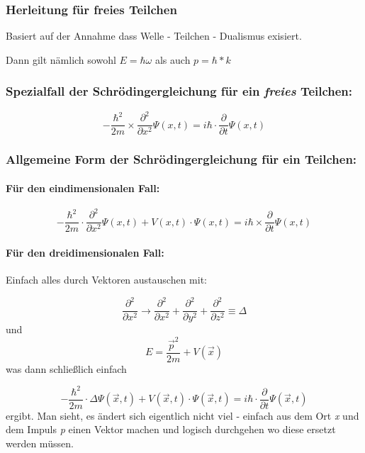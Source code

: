 \subsubsection{Herleitung für freies Teilchen}
Basiert auf der Annahme dass Welle - Teilchen - Dualismus exisiert. 

Dann gilt nämlich sowohl $E = \hbar \omega$ als auch $p = \hbar * k$

\subsubsection{Spezialfall der Schrödingergleichung für ein \textit{freies} Teilchen:}
\begin{equation}
    -\frac{\hbar^2}{2m} \times \frac{\partial^2}{\partial x^2} \Psi(x,t)  = i \hbar \cdot \frac{\partial}{\partial t} \Psi(x,t)
\end{equation}

\subsubsection{Allgemeine Form der Schrödingergleichung für ein Teilchen:}

\paragraph{Für den eindimensionalen Fall:}
\begin{equation}
    -\frac{\hbar^2}{2m} \cdot \frac{\partial^2}{\partial x^2} \Psi(x,t) + V(x,t) \cdot \Psi(x,t) = i \hbar \times \frac{\partial}{\partial t} \Psi(x,t)
\end{equation}

\paragraph{Für den dreidimensionalen Fall:}

Einfach alles durch Vektoren austauschen mit: 

\begin{equation}
    \frac{\partial^2}{\partial x^2} \longrightarrow \frac{\partial^2}{\partial x^2} + \frac{\partial^2}{\partial y^2} + \frac{\partial^2}{\partial z^2} \equiv \Delta
\end{equation}
und 
\begin{equation}
    E = \frac{\vec{p}^2}{2m} + V(\vec{x})
\end{equation}
was dann schließlich einfach

\begin{equation}
    -\frac{\hbar^2}{2m} \cdot \Delta \Psi(\vec{x},t) + V(\vec{x},t) \cdot \Psi(\vec{x},t) = i \hbar \cdot \frac{\partial}{\partial t} \Psi(\vec{x},t)
\end{equation}
ergibt. Man sieht, es ändert sich eigentlich nicht viel - einfach aus dem Ort \textit{x} und dem Impuls \textit{p} einen Vektor machen und logisch durchgehen wo diese ersetzt werden müssen. 

